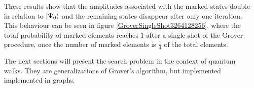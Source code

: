 \documentclass[../../dissertation.tex]{subfiles}
\begin{document}
These results show that the amplitudes associated with the marked states double
in relation to $\ket{\Psi_0}$ and the remaining states disappear after only one
iteration. This behaviour can be seen in figure
\ref{GroverSingleShot3264128256}, where the total probability of marked
elements reaches $1$ after a single shot of the Grover procedure, once the
number of marked elements is $\frac{1}{4}$ of the total elements.\par 
The next sections will present the search problem in the context of quantum
walks. They are generalizations of Grover's algorithm, but implemented
implemented in graphs.  
\end{document}
